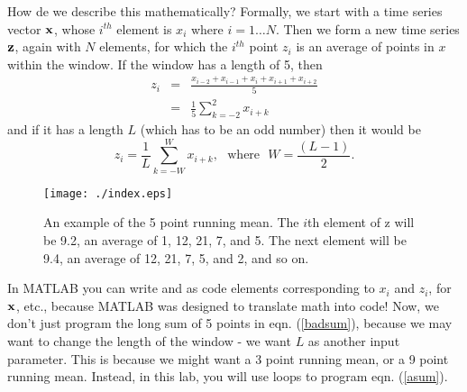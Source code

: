 \documentclass[letterpaper,11pt]{article}
\begin{document}
How de we describe this mathematically? Formally, we start with a time series vector $\bf x$, whose $i^{th}$ element is $x_i$ where
$i=1\ldots N$.
Then we form a new time series $\bf z$, again with $N$ elements, for which  the $i^{th}$ point $z_i$ is
an average of points in $x$ within the window. If the window has a length of 5, then
\begin{eqnarray}
z_i &=& \frac{ x_{i-2} + x_{i-1} + x_i + x_{i+1} + x_{i+2} }{5} \label{badsum} \\
    &=& \frac{1}{5} \sum_{k=-2}^{2} x_{i+k} 
\label{fsum}
\end{eqnarray}
and if it has a length $L$ (which has to be an odd number) then it would be
\begin{equation}
z_i = \frac{1}{L} \sum_{k=-W}^{W} x_{i+k}, ~~~\textrm{where}~~~W=\frac{(L-1)}{2}. 
\label{asum}
\end{equation}

\begin{figure}[t]
\centering
\texttt{[image: ./index.eps]}
\caption{An example of the 5 point running mean. The $i$th element of z will be 9.2, an average of 1, 12, 21, 7, and 5.  The next
element will be 9.4, an average of 12, 21, 7, 5, and 2, and so on.}
\label{f2}
\end{figure}
 
In MATLAB  you can write   and  as code elements corresponding to $x_i$ and $z_i$,   for $\bf x$, etc., because
MATLAB was designed to translate math into code! Now,
we don't just program the long sum of 5 points in eqn. (\ref{badsum}), because we may want to change the length of
the window - we want $L$ as another input parameter. This is because we might want a 3 point running mean, or a 9 point
running mean. Instead, in this lab, you will use loops to program eqn. (\ref{asum}).


\end{document}
